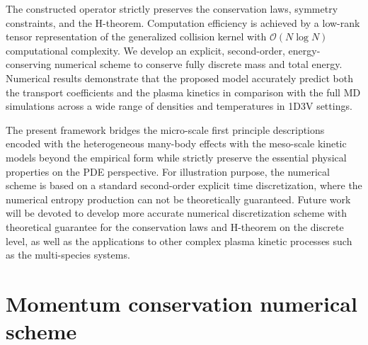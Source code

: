 \documentclass[preprint,1p,times]{elsarticle}
\newcommand{\cO}{\mathcal{O}}
\theoremstyle{definition}
\theoremstyle{remark}
\begin{document}
The constructed operator strictly preserves the conservation laws, symmetry constraints, and the H-theorem. Computation efficiency is achieved by a low-rank tensor representation of the generalized collision kernel with $\cO(N\log N)$ computational complexity. We develop an explicit, second-order, energy-conserving numerical scheme to conserve fully discrete mass and total energy. Numerical results demonstrate that the proposed model accurately predict both the transport coefficients and the plasma kinetics in comparison with the full MD simulations across a wide range of densities and temperatures in 1D3V settings. 

The present framework bridges the micro-scale first principle descriptions encoded with the heterogeneous many-body effects with the meso-scale kinetic models beyond the empirical form while strictly preserve the essential physical properties on the PDE perspective. For illustration purpose, the numerical scheme is based on a standard second-order explicit time discretization, where the numerical entropy production can not be theoretically guaranteed. Future work will be devoted to develop more accurate numerical discretization scheme with theoretical guarantee for the conservation laws and H-theorem on the discrete level, as well as the applications to other complex plasma kinetic processes such as the multi-species systems.  









\appendix

\section{Momentum conservation numerical scheme}
\label{app:mom_conserv_scheme}
\end{document}

